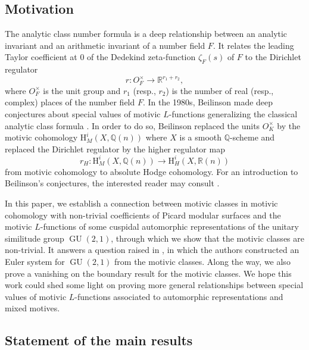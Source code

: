 \documentclass[11pt, a4paper]{amsart}
\theoremstyle{plain}
\theoremstyle{definition}
\numberwithin{equation}{section}
\def\QQ{\mathbb{Q}}
\def\RR{\mathbb{R}}
\DeclareMathOperator{\GU}{GU}
\begin{document}
\subsection{Motivation}
\label{SS: motivation}
The analytic class number formula is a deep relationship between an analytic invariant and an arithmetic invariant of a number field $F$. It relates the leading Taylor coefficient at $0$ of the Dedekind zeta-function $\zeta_{F}(s)$ of $F$ to the Dirichlet regulator 
\begin{equation*}
    r\colon O_F^{\times} \rightarrow \RR^{r_1 + r_2},
\end{equation*}
where $O_F^{\times}$ is the unit group and $r_1$ (resp., $r_2$) is the number of real (resp., complex) places of the number field $F$.  In the 1980s, Beilinson made deep conjectures about special values of motivic $L$-functions generalizing the classical analytic class formula \cite{Beilinson85}. In order to do so, Beilinson replaced the units $O_{K}^{\times}$ by the motivic cohomology $\mathrm{H}^{i}_{M}(X, \QQ(n))$ where $X$ is a smooth $\QQ$-scheme and replaced the Dirichlet regulator by the higher regulator map 
\begin{equation*}
    r_{H}\colon \mathrm{H}^{i}_{M}(X, \QQ(n)) \rightarrow \mathrm{H}_{H}^{i}(X, \RR(n))
\end{equation*}
from motivic cohomology to absolute Hodge cohomology. For an introduction to Beilinson's conjectures, the interested reader may consult \cite{Nekovar94}. 

\par In this paper, we establish a connection between motivic classes in motivic cohomology with non-trivial coefficients of Picard modular surfaces and the motivic $L$-functions of some cuspidal automorphic representations of the unitary similitude group $\GU(2, 1)$, through which we show that the motivic classes are non-trivial. It answers a question raised in \cite{LSZ22}, in which the authors constructed an Euler system for $\GU(2, 1)$ from the motivic classes. Along the way, we also prove a vanishing on the boundary result for the motivic classes. We hope this work could shed some light on proving more general relationships between special values of motivic $L$-functions associated to automorphic representations and mixed motives. 

\subsection{Statement of the main results}
\end{document}
